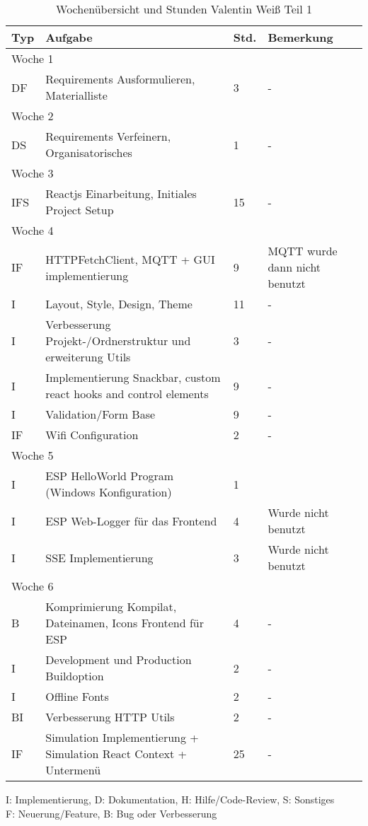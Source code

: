 \vspace{1em}
\begin{table}[!hp]
    \begin{center}
    \begin{tabular}{|p{0.8cm}|p{6cm}|p{0.8cm}|p{8cm}|} \hline
        \textbf{Typ} & \textbf{Aufgabe} & \textbf{Std.} & \textbf{Bemerkung} \\ \hline
        \multicolumn{4}{|l|}{Woche 1}       \\ \hline
		DF           & Requirements Ausformulieren, Materialliste        & 3 & -\\
        \hline
        \multicolumn{4}{|l|}{Woche 2}    \\ \hline
        DS & Requirements Verfeinern, Organisatorisches                    & 1 & -
        \\\hline
        \multicolumn{4}{|l|}{Woche 3}      \\ \hline
        IFS & Reactjs Einarbeitung, Initiales Project Setup     & 15 & - \\ \hline
        \multicolumn{4}{|l|}{Woche 4}          \\ \hline
        IF & HTTPFetchClient, MQTT + GUI implementierung     & 9 & MQTT wurde dann nicht benutzt\\
        I & Layout, Style, Design, Theme & 11 & -\\
        I & Verbesserung Projekt-/Ordnerstruktur und erweiterung Utils     & 3 & -\\
        I & Implementierung Snackbar, custom react hooks and control elements    & 9 & -\\
        I & Validation/Form Base & 9 & -\\
        IF & Wifi Configuration & 2 & - \\
        \hline
        \multicolumn{4}{|l|}{Woche 5}       \\ \hline
        I & ESP HelloWorld Program (Windows Konfiguration) & 1 & \\
        I & ESP Web-Logger für das Frontend      & 4 & Wurde nicht benutzt\\
        I & SSE Implementierung & 3 & Wurde nicht benutzt\\\hline
        \multicolumn{4}{|l|}{Woche 6}              \\ \hline
        B & Komprimierung Kompilat, Dateinamen, Icons Frontend für ESP  & 4 & -\\
        I & Development und Production Buildoption                & 2 & -\\
        I & Offline Fonts & 2 & -\\
        BI & Verbesserung HTTP Utils & 2 & - \\
        IF & Simulation Implementierung + Simulation React Context + Untermenü & 25 & - \\\hline
            \end{tabular}
    \end{center}
    \caption{Wochenübersicht und Stunden Valentin Weiß Teil 1}
    I: Implementierung, D: Dokumentation, H: Hilfe/Code-Review, S: Sonstiges\\
        F: Neuerung/Feature, B: Bug oder Verbesserung
\end{table}

